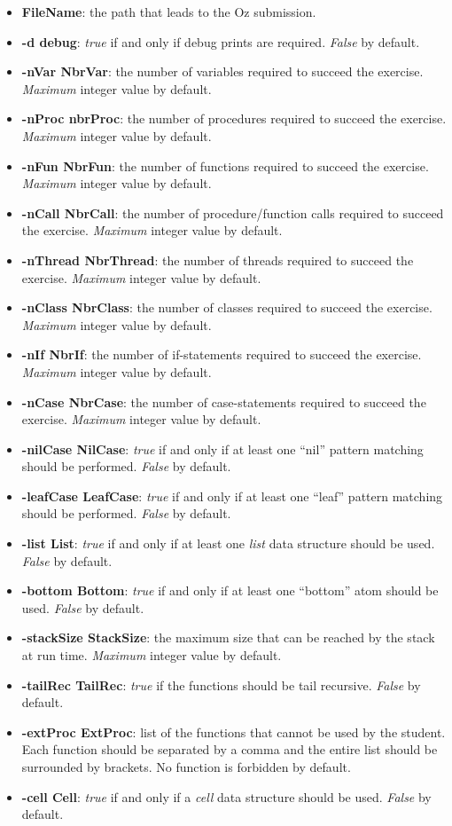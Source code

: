 \documentclass[11pt,a4paper,twoside,openright]{report}
\begin{document}
\begin{itemize}
\item \textbf{FileName}: the path that leads to the Oz submission.
\item \textbf{-d debug}: \textit{true} if and only if debug prints are 
required. \textit{False} by default.
\item \textbf{-nVar NbrVar}: the number of variables required to succeed the 
exercise. \textit{Maximum} integer value by default.
\item \textbf{-nProc nbrProc}: the number of procedures required to succeed the 
exercise. \textit{Maximum} integer value by default.
\item \textbf{-nFun NbrFun}: the number of functions required to succeed the 
exercise. \textit{Maximum} integer value by default.
\item \textbf{-nCall NbrCall}: the number of procedure/function calls required 
to succeed the exercise. \textit{Maximum} integer value by default.
\item \textbf{-nThread NbrThread}: the number of threads required to succeed 
the exercise. \textit{Maximum} integer value by default.
\item \textbf{-nClass NbrClass}: the number of classes required to succeed the 
exercise. \textit{Maximum} integer value by default.
\item \textbf{-nIf NbrIf}: the number of if-statements required to succeed the 
exercise. \textit{Maximum} integer value by default.
\item \textbf{-nCase NbrCase}: the number of case-statements required to 
succeed the exercise. \textit{Maximum} integer value by default.
\item \textbf{-nilCase NilCase}: \textit{true} if and only if at least one 
\enquote{nil} pattern matching should be performed. \textit{False} by default.
\item \textbf{-leafCase LeafCase}: \textit{true} if and only if at least one 
\enquote{leaf} pattern matching should be performed. \textit{False} by default.
\item \textbf{-list List}: \textit{true} if and only if at least one 
\textit{list} data structure should be used. \textit{False} by default.
\item \textbf{-bottom Bottom}: \textit{true} if and only if at least one 
\enquote{bottom} atom should be used. \textit{False} by default.
\item \textbf{-stackSize StackSize}: the maximum size that can be reached by 
the stack at run time. \textit{Maximum} integer value by default.
\item \textbf{-tailRec TailRec}: \textit{true} if the functions should be tail 
recursive. \textit{False} by default.
\item \textbf{-extProc ExtProc}: list of the functions that cannot be used 
by the student. Each function should be separated by a comma and the entire 
list should be surrounded by brackets. No function is forbidden by default.
\item \textbf{-cell Cell}: \textit{true} if and only if a \textit{cell} 
data structure should be used. \textit{False} by default.
\end{itemize}
\end{document}

